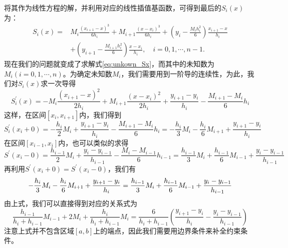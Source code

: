 将其作为线性方程的解，并利用对应的线性插值基函数，可得到最后的$S_{i}(x)$为：
\begin{equation}
	\begin{aligned}
		S_{i}(x)=& M_i \frac{\left(x_{i+1}-x\right)^3}{6 h_i}+M_{i+1} \frac{\left(x-x_i\right)^3}{6 h_i}+\left(y_i-\frac{M_i h_i^2}{6}\right) \frac{x_{i+1}-x}{h_i} \\
				&+\left(y_{i+1}-\frac{M_{i+1} h_i^2}{6}\right) \frac{x-x_i}{h_i}, \quad i=0,1, \cdots, n-1 .
	\end{aligned}
	\label{eq:unkown_Sx}
\end{equation} 
现在我们的问题就变成了求解式\eqref{eq:unkown_Sx}，而其中的未知数为$M_i(i = 0, 1, \cdots, n)$。为确定未知数$M_i$，我们需要用到一阶导的连续性，为此，我们对$S_{i}(x)$求一次导得
\begin{equation}
	S_{i}^{\prime}(x)=-M_i \frac{\left(x_{i+1}-x\right)^2}{2 h_i}+M_{i+1} \frac{\left(x-x_i\right)^2}{2 h_i}+\frac{y_{i+1}-y_i}{h_i}-\frac{M_{i+1}-M_i}{6} h_i	\label{eq:first_order_Sx}
\end{equation}
这样，在区间$[x_i, x_{i+1}]$内，我们得到
\begin{equation*}
	S_{i}^{\prime}(x_i + 0) = - \frac{h_i}{2}M_i + \frac{y_{i+1} - y_i}{h_i} - \frac{M_{i+1} - M_{i}}{6}h_i = - \frac{h_i}{3}M_i - \frac{h_i}{6}M_{i+1} + \frac{y_{i+1} - y_i}{h_i}
\end{equation*} 
在区间$[x_{i-1}, x_i]$内，也可以类似的求得
\begin{equation*}
	S^{\prime}(x_i - 0) = \frac{h_{i-1}}{2}M_{i} + \frac{y_{i} - y_{i-1}}{h_{i-1}} - \frac{M_{i} - M_{i-1}}{6}h_{i-1} = \frac{h_{i-1}}{3}M_i + \frac{h_{i-1}}{6}M_{i-1} + \frac{y_{i} - y_{i-1}}{h_{i-1}}
\end{equation*} 
再利用$S^{\prime}(x_i + 0) =S^{\prime}(x_i - 0)$，我们有
\begin{equation*}
		- \frac{h_i}{3}M_i - \frac{h_i}{6}M_{i+1} + \frac{y_{i+1} - y_i}{h_i} = \frac{h_{i-1}}{3}M_i + \frac{h_{i-1}}{6}M_{i-1} + \frac{y_{i} - y_{i-1}}{h_{i-1}}	\\
\end{equation*}
由上式，我们可以直接得到对应的关系式为
\begin{equation}
	\frac{h_{i-1}}{h_i + h_{i-1}}M_{i-1} + 2 M_i + \frac{h_{i}}{h_i + h_{i-1}}M_{i} = \frac{6}{h_i + h_{i - 1}}\left(\frac{y_{i+1} - y_i}{h_i} - \frac{y_i - y_{i - 1}}{h_{i - 1}} \right)	\label{eq:cubic_linear}
\end{equation} 
注意上式并不包含区域$[a, b]$上的端点，因此我们需要用边界条件来补全约束条件。
